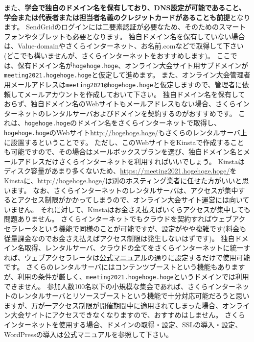 \documentclass[titlepage,10pt,a4paper,uplatex]{jsbook}
\renewcommand{\textbf}[1]{{\bfseries\sffamily#1}}
\begin{document}
また、\textbf{学会で独自のドメイン名を保有しており、DNS設定が可能であること、学会または代表者または担当者名義のクレジットカードがあることも前提}となります。
SendGridのログインには二要素認証が必要なため、そのためのスマートフォンやタブレットも必要となります。
独自ドメイン名を保有していない場合は、Value-domainやさくらインターネット、お名前.comなどで取得して下さい(どこでも構いませんが、さくらインターネットをおすすめします)。
ここでは、保有ドメイン名が\texttt{hogehoge.hoge}、オンライン大会サイト用サブドメインが\texttt{meeting2021.hogehoge.hoge}と仮定して進めます。
また、オンライン大会管理者用メールアドレスは\texttt{meeting2021@hogehoge.hoge}と仮定しますので、管理者に依頼してメールアカウントを作成しておいて下さい。
独自ドメイン名を保有しておらず、独自ドメイン名のWebサイトもメールアドレスもない場合、さくらインターネットのレンタルサーバおよびドメインを契約するのがおすすめです。
これは、\texttt{hogehoge.hoge}のドメイン名をさくらインターネットで取得し、\texttt{hogehoge.hoge}のWebサイト\url{http://hogehoge.hoge/}もさくらのレンタルサーバ上に設置するということです。
ただし、このWebサイトをKinstaで作成することも可能ですので、その場合はメールボックスプランを選び、独自ドメイン名とメールアドレスだけさくらインターネットを利用すればいいでしょう。
Kinstaはディスク容量があまり多くないため、\url{https://meeting2021.hogehoge.hoge/}をKinstaに、\url{http://hogehoge.hoge/}は別のホスティング業者に任せた方がいいと思います。
なお、さくらインターネットのレンタルサーバは、アクセスが集中するとアクセス制限がかかってしまうので、オンライン大会サイト運営には向いていません。
それに対して、Kinstaはお金さえ払えばいくらアクセスが集中しても問題ありません。
さくらインターネットでもクラウドを契約すればウェブアクセラレータという機能で同様のことが可能ですが、設定がやや複雑です(料金も従量課金なのでお金さえ払えばアクセス制限は発生しないはずです)。
独自ドメイン名取得、レンタルサーバ、クラウドの全てをさくらインターネットに統一すれば、ウェブアクセラレータは\href{https://manual.sakura.ad.jp/cloud/webaccel/manual/tips-settings-webaccel-for-rs.html}{公式マニュアル}の通りに設定するだけで使用可能です。
さくらのレンタルサーバにはコンテンツブーストという機能もありますが、利用の条件が厳しく、\texttt{meeting2021.hogehoge.hoge}というドメインでは利用できません。
参加人数100名以下の小規模な集会であれば、さくらインターネットのレンタルサーバとリソースブーストという機能で十分対応可能だろうと思いますが、万が一アクセス制限が開催期間中に適用されてしまった場合、オンライン大会サイトにアクセスできなくなりますので、おすすめはしません。
さくらインターネットを使用する場合、ドメインの取得・設定、SSLの導入・設定、WordPressの導入は公式マニュアルを参照して下さい。
\end{document}
